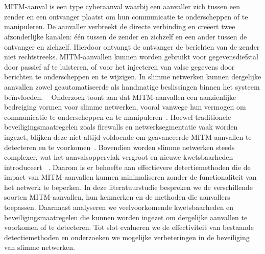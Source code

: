 \chapter{}%
\label{ch:stand-van-zaken}


\section{}%
\label{sec:Man-in-the-middle-aanvaal}
MITM-aanval is een type cyberaanval waarbij een aanvaller zich tussen een zender en een ontvanger plaatst om hun communicatie te onderscheppen of te manipuleren. De aanvaller verbreekt de directe verbinding en creëert twee afzonderlijke kanalen: één tussen de zender en zichzelf en een ander tussen de ontvanger en zichzelf. Hierdoor ontvangt de ontvanger de berichten van de zender niet rechtstreeks. MITM-aanvallen kunnen worden gebruikt voor gegevensdiefstal door passief af te luisteren, of voor het injecteren van valse gegevens door berichten te onderscheppen en te wijzigen. In slimme netwerken kunnen dergelijke aanvallen zowel geautomatiseerde als handmatige beslissingen binnen het systeem beïnvloeden. ~\autocite{ELRAWY2023}
Onderzoek toont aan dat MITM-aanvallen een aanzienlijke bedreiging vormen voor slimme netwerken, vooral vanwege hun vermogen om communicatie te onderscheppen en te manipuleren~\autocite{ELRAWY2023}. Hoewel traditionele beveiligingsmaatregelen zoals firewalls en netwerksegmentatie vaak worden ingezet, blijken deze niet altijd voldoende om geavanceerde MITM-aanvallen te detecteren en te voorkomen~\autocite{ELRAWY2023}. Bovendien worden slimme netwerken steeds complexer, wat het aanvalsoppervlak vergroot en nieuwe kwetsbaarheden introduceert ~\autocite{ELRAWY2023}. Daarom is er behoefte aan effectievere detectiemethoden die de impact van MITM-aanvallen kunnen minimaliseren zonder de functionaliteit van het netwerk te beperken.
In deze literatuurstudie bespreken we de verschillende soorten MITM-aanvallen, hun kenmerken en de methoden die aanvallers toepassen. Daarnaast analyseren we veelvoorkomende kwetsbaarheden en beveiligingsmaatregelen die kunnen worden ingezet om dergelijke aanvallen te voorkomen of te detecteren. Tot slot evalueren we de effectiviteit van bestaande detectiemethoden en onderzoeken we mogelijke verbeteringen in de beveiliging van slimme netwerken.


